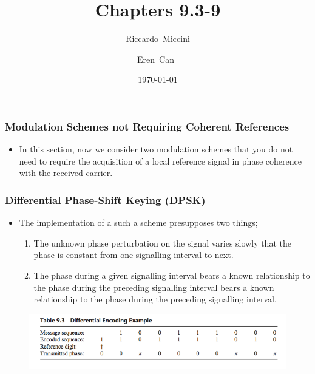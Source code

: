 \documentclass{beamer}
\title{Chapters 9.3-9}
\subtitle{}
\author[Riccardo \and Eren]{Riccardo~Miccini\inst{1} \and Eren~Can~\inst{1}}
\institute[DTU]
{
	\inst{1}
	Technical University of Denmark\\
	Digital Communication
}
\date{\today}
\begin{document}
\frame{\titlepage}

\begin{frame}
	\frametitle{Modulation Schemes not Requiring Coherent References}
	\begin{itemize}
		\item In this section, now we consider two modulation schemes that you do not need to require the acquisition of  a local reference signal in phase coherence with the received carrier. 
	\end{itemize}
\end{frame}

\begin{frame}
	\frametitle{Differential Phase-Shift Keying  (DPSK)}
	\begin{itemize}
		\item The implementation of a such a scheme presupposes two things;
		\begin{enumerate}
		\item The unknown phase perturbation on the signal varies  slowly that the phase is constant from one signalling interval to next.
		\item  The phase during a given signalling interval bears a known relationship to the phase during the preceding signalling interval bears a known relationship to the phase during the preceding signalling interval.
	\end{enumerate}
	\end{itemize}
	\begin{figure}
	\includegraphics[width=\textwidth]{9_3.png}
	\end{figure}
\end{frame}
\end{document}
